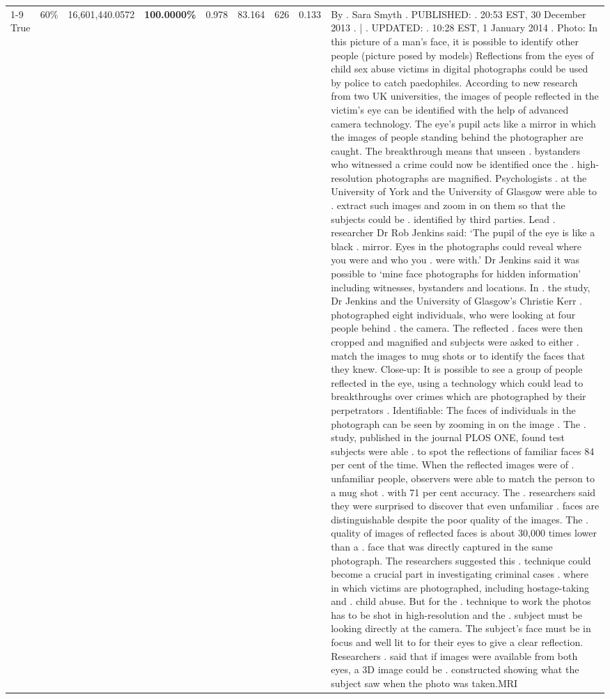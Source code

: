 \begin{table}[H]
\begin{tabular}{lllrlllll}
\cline{1-9} \cline{2-9}
True & 60\% & 16,601,440.0572 & \bfseries \color{red} 100.0000\% & 0.978 & 83.164 & 626 & 0.133 & By . Sara Smyth . PUBLISHED: . 20:53 EST, 30 December 2013 . | . UPDATED: . 10:28 EST, 1 January 2014 . Photo: In this picture of a man's face, it is possible to identify other people (picture posed by models) Reflections from the eyes of child sex abuse victims in digital photographs could be used by police to catch paedophiles. According to new research from two UK universities, the images of people reflected in the victim's eye can be identified with the help of advanced camera technology. The eye's pupil acts like a mirror in which the images of people standing behind the photographer are caught. The breakthrough means that unseen . bystanders who witnessed a crime could now be identified once the . high-resolution photographs are magnified. Psychologists . at the University of York and the University of Glasgow were able to . extract such images and zoom in on them so that the subjects could be . identified by third parties. Lead . researcher Dr Rob Jenkins said: ‘The pupil of the eye is like a black . mirror. Eyes in the photographs could reveal where you were and who you . were with.' Dr Jenkins said it was possible to ‘mine face photographs for hidden information' including witnesses, bystanders and locations. In . the study, Dr Jenkins and the University of Glasgow's Christie Kerr . photographed eight individuals, who were looking at four people behind . the camera. The reflected . faces were then cropped and magnified and subjects were asked to either . match the images to mug shots or to identify the faces that they knew. Close-up: It is possible to see a group of people reflected in the eye, using a technology which could lead to breakthroughs over crimes which are photographed by their perpetrators . Identifiable: The faces of individuals in the photograph can be seen by zooming in on the image . The . study, published in the journal PLOS ONE, found test subjects were able . to spot the reflections of familiar faces 84 per cent of the time. When the reflected images were of . unfamiliar people, observers were able to match the person to a mug shot . with 71 per cent accuracy. The . researchers said they were surprised to discover that even unfamiliar . faces are distinguishable despite the poor quality of the images. The . quality of images of reflected faces is about 30,000 times lower than a . face that was directly captured in the same photograph. The researchers suggested this . technique could become a crucial part in investigating criminal cases . where in which victims are photographed, including hostage-taking and . child abuse. But for the . technique to work the photos has to be shot in high-resolution and the . subject must be looking directly at the camera. The subject's face must be in focus and well lit to for their eyes to give a clear reflection. Researchers . said that if images were available from both eyes, a 3D image could be . constructed showing what the subject saw when the photo was taken.MRI \\

\end{tabular}
\end{table}
